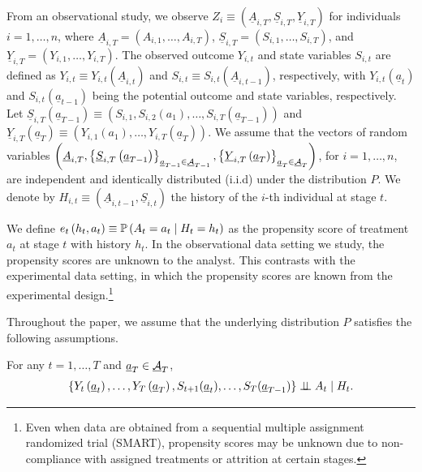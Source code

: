 From an observational study, we observe $Z_{i}\equiv \left(\underline{A}_{i,T},\underline{S}_{i,T},\underline{Y}_{i,T}\right)$ for individuals $i=1,\ldots,n$, where $\underline{A}_{i,T}=(A_{i,1},\ldots,A_{i,T})$, $\underline{S}_{i,T}=(S_{i,1},\ldots,S_{i,T})$, and $\underline{Y}_{i,T}=(Y_{i,1},\ldots,Y_{i,T})$. The observed outcome $Y_{i,t}$ and state variables $S_{i,t}$ are defined as $Y_{i,t}  \equiv Y_{i,t}(\underline{A}_{i,t})$ and $S_{i,t}  \equiv S_{i,t}(\underline{A}_{i,t-1})$, respectively, with $Y_{i,t}\left(\underline{a}_{t}\right)$ and $S_{i,t}\left(\underline{a}_{t-1}\right)$ being the
potential outcome and state variables, respectively. Let $\underline{S}_{i,T}(\underline{a}_{T-1}) \equiv (S_{i,1},S_{i,2}(a_1),\ldots,S_{i,T}(\underline{a}_{T-1}))$ and $\underline{Y}_{i,T}(\underline{a}_{T}) \equiv (Y_{i,1}(a_1),\ldots,Y_{i,T}(\underline{a}_{T}))$. We assume that the vectors of random variables $\left(\underline{A}_{i,T},\left\{\underline{S}_{i,T}\left(\text{\ensuremath{\underline{a}}}_{T-1}\right)\right\}_{\text{\ensuremath{\underline{a}}}_{T-1}\in\underline{\mathcal{A}}_{T-1}}, \left\{ \underline{Y}_{i,T}\left(\text{\ensuremath{\underline{a}}}_{T}\right)\right\} _{\text{\ensuremath{\underline{a}}}_{T}\in\underline{\mathcal{A}}_{T}}\right)$, for $i=1,\ldots,n$, are independent and identically distributed (i.i.d) under the distribution $P$. 
We denote by $H_{i,t}\equiv (\underline{A}_{i,t-1},\underline{S}_{i,t})$ the history of the $i$-th individual at stage $t$.

We define $e_{t}\left(h_{t},a_{t}\right)\equiv \mathbb{P}\left(A_{t}=a_{t}\mid H_{t}=h_{t}\right)$ as the propensity score of treatment $a_t$ at stage $t$ with  history $h_t$. In the observational data setting we study, the propensity scores are unknown to the analyst. This contrasts with the experimental data setting, in which the propensity scores are known from the experimental design.\footnote{Even when data are obtained from a sequential multiple assignment randomized trial (SMART), propensity scores may be unknown due to non-compliance with assigned treatments or attrition at certain stages.}

Throughout the paper, we assume that the underlying distribution $P$ satisfies the following assumptions.

\medskip

\begin{assumption}\label{asm:sequential independence} For any $t=1,\ldots,T$ and $\text{\ensuremath{\underline{a}}}_{T}\in\underline{\mathcal{A}}_{T}$,
\begin{align*}
\{Y_{t}\left(\underline{a}_{t}\right),\ldots,Y_{T}\left(\underline{a}_{T}\right),S_{t+1}(\underline{a}_{t}),\ldots,S_{T}(\underline{a}_{T-1})\} \perp \!\!\! \perp A_{t} \mid H_{t}.  
\end{align*}
\end{assumption}

